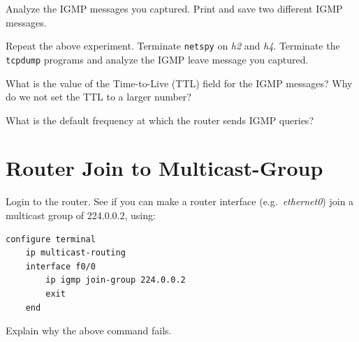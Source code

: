 \documentclass{../UTNetLab}
\begin{document}
    Analyze the IGMP messages you captured.
    Print and save two different IGMP messages.

    Repeat the above experiment.
    Terminate \lstinline{netspy} on \textit{h2} and \textit{h4}.
    Terminate the \lstinline{tcpdump} programs and analyze the IGMP leave message you captured.
    
    \begin{report}
        \item What is the value of the Time-to-Live (TTL) field for the IGMP messages?
            Why do we not set the TTL to a larger number?

        \item What is the default frequency at which the router sends IGMP queries?
    \end{report}

\section{Router Join to Multicast-Group}
    Login to the router.
    See if you can make a router interface (e.g.\ \textit{ethernet0}) join a multicast group of 224.0.0.2, using:

    \begin{lstlisting}[language={cisco}]
configure terminal
    ip multicast-routing
    interface f0/0
        ip igmp join-group 224.0.0.2
        exit
    end
    \end{lstlisting}
    
    \begin{report}
        \item Explain why the above command fails.
    \end{report}
\end{document}
